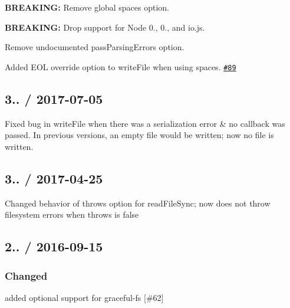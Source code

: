 
\begin{DoxyItemize}
\item {\bfseries B\+R\+E\+A\+K\+I\+NG\+:} Remove global {\ttfamily spaces} option.
\item {\bfseries B\+R\+E\+A\+K\+I\+NG\+:} Drop support for Node 0., 0., and io.\+js.
\item Remove undocumented {\ttfamily pass\+Parsing\+Errors} option.
\item Added {\ttfamily E\+OL} override option to {\ttfamily write\+File} when using {\ttfamily spaces}. \href{https://github.com/jprichardson/node-jsonfile/pull/89}{\tt \#89}
\end{DoxyItemize}

\subsection*{3.. / 2017-\/07-\/05 }


\begin{DoxyItemize}
\item Fixed bug in {\ttfamily write\+File} when there was a serialization error \& no callback was passed. In previous versions, an empty file would be written; now no file is written.
\end{DoxyItemize}

\subsection*{3.. / 2017-\/04-\/25 }


\begin{DoxyItemize}
\item Changed behavior of {\ttfamily throws} option for {\ttfamily read\+File\+Sync}; now does not throw filesystem errors when {\ttfamily throws} is {\ttfamily false}
\end{DoxyItemize}

\subsection*{2.. / 2016-\/09-\/15 }

\subsubsection*{Changed}


\begin{DoxyItemize}
\item added optional support for {\ttfamily graceful-\/fs} \mbox{[}\#62\mbox{]}
\end{DoxyItemize}

